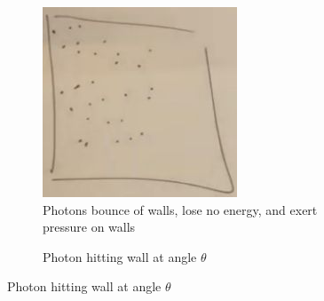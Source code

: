 \documentclass[]{article}
\begin{document}
\begin{figure}[H]
	\caption{A box of photons}
	\begin{subfigure}[t]{0.55\textwidth}
		\caption{Photons bounce of walls, lose no energy, and exert pressure on walls}\label{fig:cosmo-5-box-photons}
		\includegraphics[width=\textwidth]{cosmo-5-box-photons}
	\end{subfigure}
	\begin{subfigure}[t]{0.4\textwidth}
		\caption{Photon hitting wall at angle $\theta$}\label{fig:cosmo-5-wall}

\end{subfigure}
\end{figure}
\end{document}
